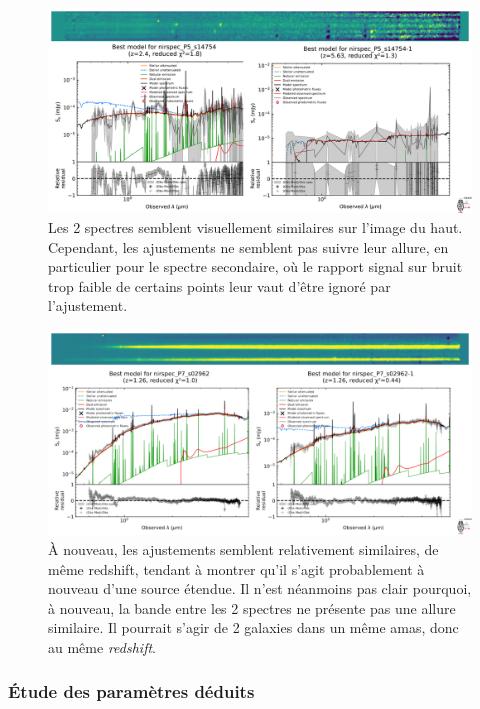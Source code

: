 \documentclass[12pt, a4paper]{article}
\begin{document}
\begin{figure}[!h]
  \centering
  \includegraphics[width=1\textwidth]{assets/double_P5_s14754.png}
  \caption{Les 2 spectres semblent visuellement similaires sur l'image du haut. Cependant, les ajustements ne semblent pas suivre leur allure, en particulier pour le spectre secondaire, où le rapport signal sur bruit trop faible de certains points leur vaut d'être ignoré par l'ajustement.}
  \label{fig:P5_s14754}
\end{figure}

\begin{figure}[!h]
  \centering
  \includegraphics[width=1\textwidth]{assets/double_P7_s02962.png}
  \caption{À nouveau, les ajustements semblent relativement similaires, de même redshift, tendant à montrer qu'il s'agit probablement à nouveau d'une source étendue. Il n'est néanmoins pas clair pourquoi, à nouveau, la bande entre les 2 spectres ne présente pas une allure similaire. Il pourrait s'agir de 2 galaxies dans un même amas, donc au même \textit{redshift}.}
  \label{fig:P7_s02962}
\end{figure}

\subsubsection{Étude des paramètres déduits}
\end{document}
